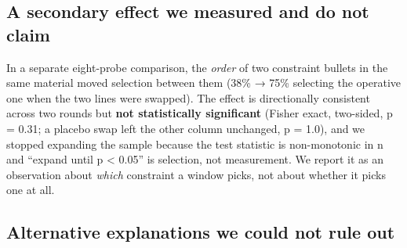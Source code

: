 \documentclass[
]{article}
\begin{document}
\subsection{A secondary effect we measured and do not
claim}\label{a-secondary-effect-we-measured-and-do-not-claim}

In a separate eight-probe comparison, the \emph{order} of two constraint
bullets in the same material moved selection between them (38\% → 75\%
selecting the operative one when the two lines were swapped). The effect
is directionally consistent across two rounds but \textbf{not
statistically significant} (Fisher exact, two-sided, p = 0.31; a placebo
swap left the other column unchanged, p = 1.0), and we stopped expanding
the sample because the test statistic is non-monotonic in n and ``expand
until p \textless{} 0.05'' is selection, not measurement. We report it
as an observation about \emph{which} constraint a window picks, not
about whether it picks one at all.

\subsection{Alternative explanations we could not rule
out}\label{alternative-explanations-we-could-not-rule-out-2}
\end{document}
